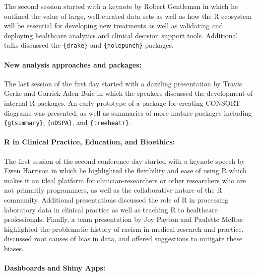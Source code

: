 The second session started with a keynote by Robert Gentleman in which he outlined the value of large, well-curated data sets as well as how the R ecosystem will be essential for developing new treatments as well as validating and deploying healthcare analytics and clinical decision support tools. Additional talks discussed the \texttt{\{drake\}} and \texttt{\{holepunch\}} packages.

\hypertarget{new-analysis-approaches-and-packages}{%
\paragraph{New analysis approaches and packages:}\label{new-analysis-approaches-and-packages}}

The last session of the first day started with a dazzling presentation by Travis Gerke and Garrick Aden-Buie in which the speakers discussed the development of internal R packages. An early prototype of a package for creating CONSORT diagrams was presented, as well as summaries of more mature packages including \texttt{\{gtsummary\}}, \texttt{\{nDSPA\}}, and \texttt{\{treeheatr\}}.

\hypertarget{r-in-clinical-practice-education-and-bioethics}{%
\paragraph{R in Clinical Practice, Education, and Bioethics:}\label{r-in-clinical-practice-education-and-bioethics}}

The first session of the second conference day started with a keynote speech by Ewen Harrison in which he highlighted the flexibility and ease of using R which makes it an ideal platform for clinician-researchers or other researchers who are not primarily programmers, as well as the collaborative nature of the R community. Additional presentations discussed the role of R in processing laboratory data in clinical practice as well as teaching R to healthcare professionals. Finally, a team presentation by Joy Payton and Paulette McRae highlighted the problematic history of racism in medical research and practice, discussed root causes of bias in data, and offered suggestions to mitigate these biases.

\hypertarget{dashboards-and-shiny-apps}{%
\paragraph{Dashboards and Shiny Apps:}\label{dashboards-and-shiny-apps}}

